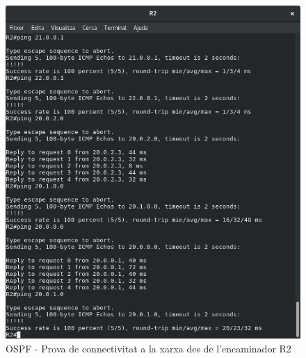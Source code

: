 \documentclass[10pt]{article}
\begin{document}
\begin{figure}[H]
\begin{center}
\includegraphics[scale=0.4]{Images/ospf-R2-conectivity.png}
\caption{OSPF - Prova de connectivitat a la xarxa des de l'encaminador R2}
\end{center}
\end{figure}
\end{document}
